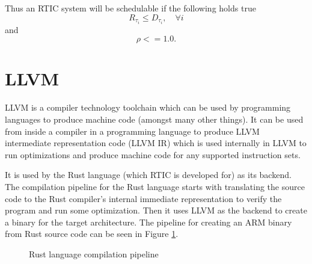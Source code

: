 Thus an RTIC system will be schedulable if the following holds true
\begin{equation}
    R_{\tau_i} \leq D_{\tau_i}, \quad \forall i
\end{equation}
and
\begin{equation}
    \rho <= 1.0.
\end{equation}


\section{LLVM}
LLVM is a compiler technology toolchain which can be used by programming
languages to produce machine code (amongst many other things). It can be used
from inside a compiler in a programming language to produce LLVM intermediate
representation code (LLVM IR) which is used internally in LLVM to run
optimizations and produce machine code for any supported instruction sets.

It is used by the Rust language (which RTIC is developed for) as its backend.
The compilation pipeline for the Rust language starts with translating the
source code to the Rust compiler's internal immediate representation to
verify the program and run some optimization. Then it uses LLVM as the backend
to create a binary for the target architecture. The pipeline for creating an
ARM binary from Rust source code can be seen in Figure
\ref{figure:rustcompilation}.
\begin{figure}[h]
    \centering
    \caption{Rust language compilation pipeline}
    \label{figure:rustcompilation}
\end{figure}



